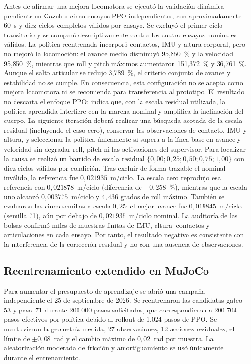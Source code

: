 Antes de afirmar una mejora locomotora se ejecutó la validación dinámica
pendiente en Gazebo: cinco ensayos PPO independientes, con aproximadamente
60~s y diez ciclos completos válidos por ensayo. Se excluyó el primer ciclo
transitorio y se comparó descriptivamente contra los cuatro ensayos nominales válidos. La
política reentrenada incorporó contactos, IMU y altura corporal, pero no mejoró
la locomoción: el avance medio disminuyó 95,850~\% y la velocidad 95,850~\%,
mientras que roll y pitch máximos aumentaron 151,372~\% y 36,761~\%. Aunque el salto
articular se redujo 3,789~\%, el criterio conjunto de avance y estabilidad no se
cumple. En consecuencia, esta configuración no se acepta como mejora
locomotora ni se recomienda para transferencia al prototipo. El resultado no
descarta el enfoque PPO: indica que, con la escala residual utilizada, la
política aprendida interfiere con la marcha nominal y amplifica la inclinación
del cuerpo. La siguiente iteración deberá realizar una búsqueda acotada de la
escala residual (incluyendo el caso cero), conservar las observaciones de
contacto, IMU y altura, y seleccionar la política únicamente si supera a la
línea base en avance y velocidad sin degradar roll, pitch ni las activaciones
del supervisor. Para localizar la causa se realizó un barrido de escala
residual $\{0{,}00;0{,}25;0{,}50;0{,}75;1{,}00\}$ con diez ciclos válidos por
condición. Tras excluir de forma trazable el nominal inválido, la referencia
fue $0{,}021935$~m/ciclo. La escala cero reprodujo esa referencia con
$0{,}021878$~m/ciclo (diferencia de $-0{,}258$~\%), mientras que la escala uno alcanzó
$0{,}003775$~m/ciclo y $4{,}436$ grados de roll máximo. También se evaluaron
las cinco semillas a escala $0{,}25$: el mejor avance fue $0{,}019845$~m/ciclo
(semilla 71), aún por debajo de $0{,}021935$~m/ciclo nominal. La auditoría de
las bolsas confirmó miles de muestras finitas de IMU, altura, contactos y
articulaciones en cada ensayo. Por tanto, el resultado negativo es consistente
con la interferencia de la corrección residual y no con una ausencia de
observaciones.

\subsection{Reentrenamiento extendido en MuJoCo}

Para aumentar el presupuesto de aprendizaje se abrió una campaña independiente
el 25 de septiembre de 2026. Se reentrenaron las candidatas gateo--53 y
paso--71 durante 200.000 pasos solicitados, que correspondieron a 200.704 pasos
efectivos por política debido al rollout de 1.024 pasos de PPO. Se mantuvieron
la geometría medida, 27 observaciones, 12 acciones residuales, el límite de
$\pm 0{,}08$~rad y el cambio máximo de $0{,}02$~rad por muestra. La
aleatorización moderada de fricción y amortiguamiento se usó únicamente durante
el entrenamiento.

